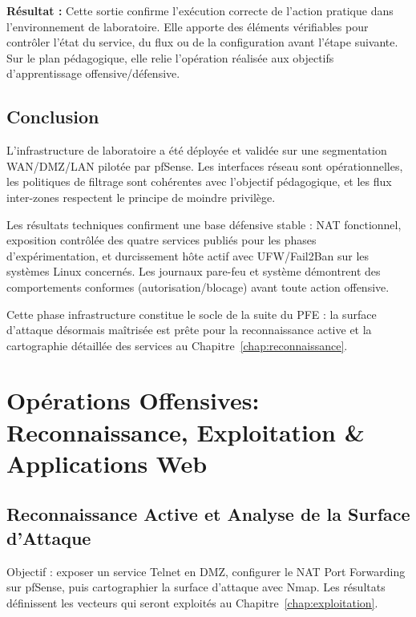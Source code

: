 \documentclass[12pt,a4paper,openany]{report}
\begin{document}
	\textbf{Résultat :} Cette sortie confirme l'exécution correcte de l'action pratique dans l'environnement de laboratoire. Elle apporte des éléments vérifiables pour contrôler l'état du service, du flux ou de la configuration avant l'étape suivante. Sur le plan pédagogique, elle relie l'opération réalisée aux objectifs d'apprentissage offensive/défensive.
	
	
	\section{Conclusion}
	
	L'infrastructure de laboratoire a été déployée et validée sur une segmentation WAN/DMZ/LAN pilotée par pfSense. Les interfaces réseau sont opérationnelles, les politiques de filtrage sont cohérentes avec l'objectif pédagogique, et les flux inter-zones respectent le principe de moindre privilège.
	
	Les résultats techniques confirment une base défensive stable : NAT fonctionnel, exposition contrôlée des quatre services publiés pour les phases d'expérimentation, et durcissement hôte actif avec UFW/Fail2Ban sur les systèmes Linux concernés. Les journaux pare-feu et système démontrent des comportements conformes (autorisation/blocage) avant toute action offensive.
	
	Cette phase infrastructure constitue le socle de la suite du PFE : la surface d'attaque désormais maîtrisée est prête pour la reconnaissance active et la cartographie détaillée des services au Chapitre~\ref{chap:reconnaissance}.
	
	\chapter{Opérations Offensives: Reconnaissance, Exploitation \& Applications Web}
	\label{chap:offensive}
	\label{chap:reconnaissance}
	\label{chap:exploitation}
	\label{chap:dvwa}
	
	\section{Reconnaissance Active et Analyse de la Surface d'Attaque}
	\label{sec:recon}
	
	\begin{tcolorbox}[colback=primary!5!white, colframe=primary, title=\textbf{Objectifs de la section}]
		Objectif : exposer un service Telnet en DMZ, configurer le NAT Port Forwarding sur pfSense, puis cartographier la surface d'attaque avec Nmap. Les résultats définissent les vecteurs qui seront exploités au Chapitre~\ref{chap:exploitation}.
	\end{tcolorbox}
	
\end{document}
